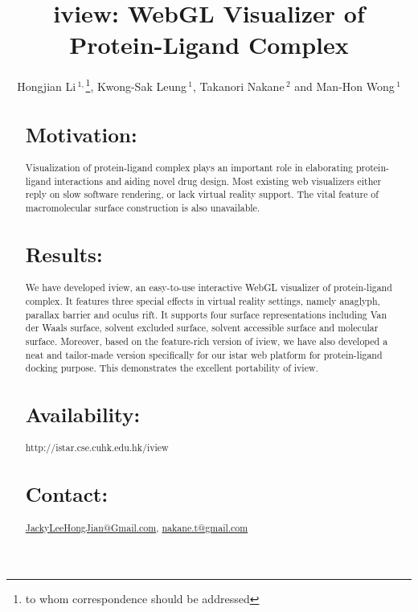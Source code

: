 \documentclass{bioinfo}
\begin{document}

\title[iview]{iview: WebGL Visualizer of Protein-Ligand Complex}
\author[Hongjian Li \textit{et~al}]{Hongjian Li\,$^{1,}$\footnote{to whom correspondence should be addressed}, Kwong-Sak Leung\,$^{1}$, Takanori Nakane\,$^{2}$ and Man-Hon Wong\,$^{1}$}
\address{$^{1}$Department of Computer Science and Engineering, Chinese University of Hong Kong, Hong Kong\\
$^{2}$Graduate School of Medicine, Kyoto University, Japan}



\maketitle

\begin{abstract}

\section{Motivation:}
Visualization of protein-ligand complex plays an important role in elaborating protein-ligand interactions and aiding novel drug design. Most existing web visualizers either reply on slow software rendering, or lack virtual reality support. The vital feature of macromolecular surface construction is also unavailable.

\section{Results:}
We have developed iview, an easy-to-use interactive WebGL visualizer of protein-ligand complex. It features three special effects in virtual reality settings, namely anaglyph, parallax barrier and oculus rift. It supports four surface representations including Van der Waals surface, solvent excluded surface, solvent accessible surface and molecular surface. Moreover, based on the feature-rich version of iview, we have also developed a neat and tailor-made version specifically for our istar web platform for protein-ligand docking purpose. This demonstrates the excellent portability of iview.

\section{Availability:}
http://istar.cse.cuhk.edu.hk/iview

\section{Contact:} \href{JackyLeeHongJian@Gmail.com}{JackyLeeHongJian@Gmail.com}, \href{nakane.t@gmail.com}{nakane.t@gmail.com}
\end{abstract}
\end{document}
